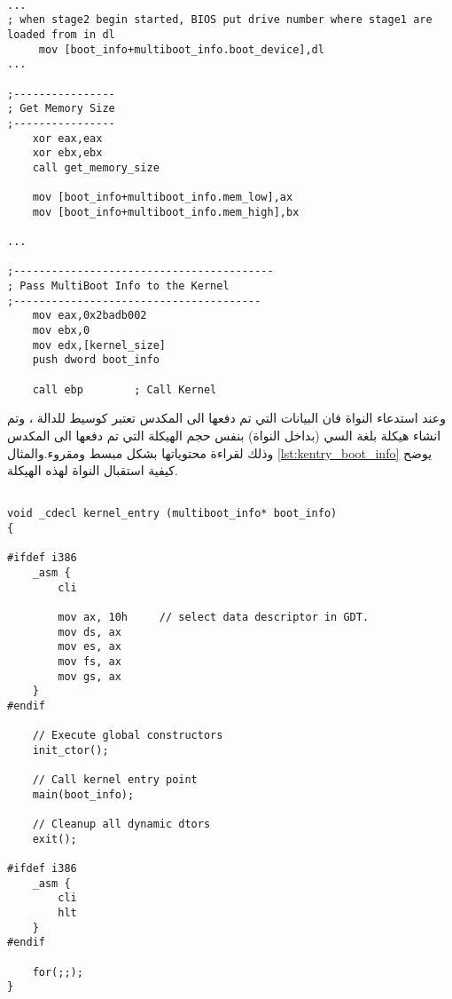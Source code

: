 \documentclass[document.tex]{subfiles}
\begin{document}
\begin{english}
\lstset{numberstyle=\tiny,numbers=left,stepnumber=1,numbersep=5pt,tabsize=2,extendedchars=true,breaklines=true,frame=b,showspaces=false, showtabs=false,xleftmargin=10pt,framexleftmargin=10pt,framexrightmargin=5pt,framexbottommargin=4pt,showstringspaces=false,language=[x86masm]Assembler}

\begin{lstlisting}[label=lst:stage2_multiboot,caption=\en{snippet from stage2 bootloader}]

...
; when stage2 begin started, BIOS put drive number where stage1 are loaded from in dl 
     mov [boot_info+multiboot_info.boot_device],dl
...

;----------------
; Get Memory Size
;----------------
    xor eax,eax
    xor ebx,ebx
    call get_memory_size
		
    mov [boot_info+multiboot_info.mem_low],ax
    mov [boot_info+multiboot_info.mem_high],bx

...

;-----------------------------------------
; Pass MultiBoot Info to the Kernel
;---------------------------------------
    mov eax,0x2badb002
    mov ebx,0
    mov edx,[kernel_size]
    push dword boot_info
				
    call ebp		; Call Kernel

\end{lstlisting}
\end{english}

وعند استدعاء النواة فان البيانات التي تم دفعها الى المكدس تعتبر كوسيط للدالة ، وتم انشاء هيكلة بلغة السي (بداخل النواة) بنفس حجم الهيكلة التي تم دفعها الى المكدس وذلك لقراءة محتوياتها بشكل مبسط ومقروء.والمثال \ref{lst:kentry_boot_info} يوضح كيفية استقبال النواة لهذه الهيكلة.
\begin{english}

\lstset{numberstyle=\tiny,numbers=left,stepnumber=1,numbersep=5pt,tabsize=2,extendedchars=true,breaklines=true,frame=b,showspaces=false, showtabs=false,xleftmargin=10pt,framexleftmargin=10pt,framexrightmargin=5pt,framexbottommargin=4pt,showstringspaces=false,language=C++}

\begin{lstlisting}[label=lst:kentry_boot_info,caption=\en{Kernel Entry}]

void _cdecl kernel_entry (multiboot_info* boot_info)
{

#ifdef i386
	_asm {
		cli						
		
		mov ax, 10h		// select data descriptor in GDT.
		mov ds, ax
		mov es, ax
		mov fs, ax
		mov gs, ax
	}
#endif

	// Execute global constructors
	init_ctor();

	// Call kernel entry point
	main(boot_info);

	// Cleanup all dynamic dtors
	exit();

#ifdef i386
	_asm {
		cli
		hlt
	}
#endif

	for(;;);
}

\end{lstlisting}
\end{english}
\end{document}
